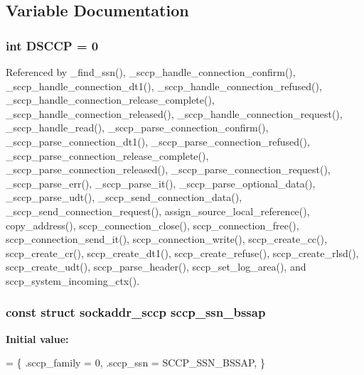 \subsection{Variable Documentation}
\subsubsection[{D\+S\+C\+CP}]{\setlength{\rightskip}{0pt plus 5cm}int D\+S\+C\+CP = 0\hspace{0.3cm}{\ttfamily [static]}}\label{sccp_8c_a76289a1eaad826ce833ea29955728e6b}


Referenced by \+\_\+find\+\_\+ssn(), \+\_\+sccp\+\_\+handle\+\_\+connection\+\_\+confirm(), \+\_\+sccp\+\_\+handle\+\_\+connection\+\_\+dt1(), \+\_\+sccp\+\_\+handle\+\_\+connection\+\_\+refused(), \+\_\+sccp\+\_\+handle\+\_\+connection\+\_\+release\+\_\+complete(), \+\_\+sccp\+\_\+handle\+\_\+connection\+\_\+released(), \+\_\+sccp\+\_\+handle\+\_\+connection\+\_\+request(), \+\_\+sccp\+\_\+handle\+\_\+read(), \+\_\+sccp\+\_\+parse\+\_\+connection\+\_\+confirm(), \+\_\+sccp\+\_\+parse\+\_\+connection\+\_\+dt1(), \+\_\+sccp\+\_\+parse\+\_\+connection\+\_\+refused(), \+\_\+sccp\+\_\+parse\+\_\+connection\+\_\+release\+\_\+complete(), \+\_\+sccp\+\_\+parse\+\_\+connection\+\_\+released(), \+\_\+sccp\+\_\+parse\+\_\+connection\+\_\+request(), \+\_\+sccp\+\_\+parse\+\_\+err(), \+\_\+sccp\+\_\+parse\+\_\+it(), \+\_\+sccp\+\_\+parse\+\_\+optional\+\_\+data(), \+\_\+sccp\+\_\+parse\+\_\+udt(), \+\_\+sccp\+\_\+send\+\_\+connection\+\_\+data(), \+\_\+sccp\+\_\+send\+\_\+connection\+\_\+request(), assign\+\_\+source\+\_\+local\+\_\+reference(), copy\+\_\+address(), sccp\+\_\+connection\+\_\+close(), sccp\+\_\+connection\+\_\+free(), sccp\+\_\+connection\+\_\+send\+\_\+it(), sccp\+\_\+connection\+\_\+write(), sccp\+\_\+create\+\_\+cc(), sccp\+\_\+create\+\_\+cr(), sccp\+\_\+create\+\_\+dt1(), sccp\+\_\+create\+\_\+refuse(), sccp\+\_\+create\+\_\+rlsd(), sccp\+\_\+create\+\_\+udt(), sccp\+\_\+parse\+\_\+header(), sccp\+\_\+set\+\_\+log\+\_\+area(), and sccp\+\_\+system\+\_\+incoming\+\_\+ctx().

\subsubsection[{sccp\+\_\+ssn\+\_\+bssap}]{\setlength{\rightskip}{0pt plus 5cm}const struct sockaddr\+\_\+sccp sccp\+\_\+ssn\+\_\+bssap}\label{sccp_8c_a4eeacfdb01f87cf6d5a676c97f3fa251}
{\bfseries Initial value\+:}
\begin{DoxyCode}
= \{
        .sccp\_family    = 0,
        .sccp\_ssn       = SCCP\_SSN\_BSSAP,
\}
\end{DoxyCode}
